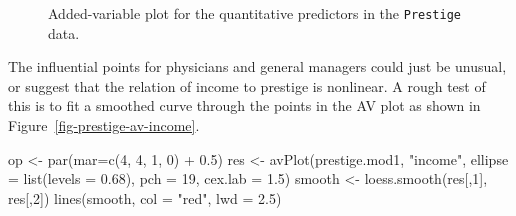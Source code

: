 \documentclass[
  letterpaper,
  10pt,
  krantz2]{krantz}
\makeatletter
\newenvironment{Shaded}{\begin{snugshade}}{\end{snugshade}}
\newcommand{\AttributeTok}[1]{\textcolor[rgb]{0.40,0.45,0.13}{#1}}
\newcommand{\DecValTok}[1]{\textcolor[rgb]{0.68,0.00,0.00}{#1}}
\newcommand{\FloatTok}[1]{\textcolor[rgb]{0.68,0.00,0.00}{#1}}
\newcommand{\FunctionTok}[1]{\textcolor[rgb]{0.28,0.35,0.67}{#1}}
\newcommand{\NormalTok}[1]{\textcolor[rgb]{0.00,0.23,0.31}{#1}}
\newcommand{\OtherTok}[1]{\textcolor[rgb]{0.00,0.23,0.31}{#1}}
\newcommand{\SpecialCharTok}[1]{\textcolor[rgb]{0.37,0.37,0.37}{#1}}
\newcommand{\StringTok}[1]{\textcolor[rgb]{0.13,0.47,0.30}{#1}}
\newenvironment{kframe}{%
  \medskip{}
  \setlength{\fboxsep}{.8em}
  \def\at@end@of@kframe{}%
  \ifinner\ifhmode%
  \def\at@end@of@kframe{\end{minipage}}%
  \begin{minipage}{\columnwidth}%
  \fi\fi%
  \def\FrameCommand##1{\hskip\@totalleftmargin \hskip-\fboxsep
  \colorbox{shadecolor}{##1}\hskip-\fboxsep
      \hskip-\linewidth \hskip-\@totalleftmargin \hskip\columnwidth}%
  \MakeFramed {\advance\hsize-\width
    \@totalleftmargin\z@ \linewidth\hsize
    \@setminipage}}%
{\par\unskip\endMakeFramed%
  \at@end@of@kframe}
\renewenvironment{Shaded}{\begin{kframe}}{\end{kframe}}
\makeatother
\begin{document}
\begin{figure}[H]


\caption{\label{fig-prestige-avplot}Added-variable plot for the
quantitative predictors in the \texttt{Prestige} data.}

\end{figure}%

The influential points for physicians and general managers could just be
unusual, or suggest that the relation of income to prestige is
nonlinear. A rough test of this is to fit a smoothed curve through the
points in the AV plot as shown in Figure~\ref{fig-prestige-av-income}.

\begin{Shaded}
\begin{Highlighting}[]
\NormalTok{op }\OtherTok{\textless{}{-}} \FunctionTok{par}\NormalTok{(}\AttributeTok{mar=}\FunctionTok{c}\NormalTok{(}\DecValTok{4}\NormalTok{, }\DecValTok{4}\NormalTok{, }\DecValTok{1}\NormalTok{, }\DecValTok{0}\NormalTok{) }\SpecialCharTok{+} \FloatTok{0.5}\NormalTok{)}
\NormalTok{res }\OtherTok{\textless{}{-}} \FunctionTok{avPlot}\NormalTok{(prestige.mod1, }\StringTok{"income"}\NormalTok{,}
              \AttributeTok{ellipse =} \FunctionTok{list}\NormalTok{(}\AttributeTok{levels =} \FloatTok{0.68}\NormalTok{),}
              \AttributeTok{pch =} \DecValTok{19}\NormalTok{,}
              \AttributeTok{cex.lab =} \FloatTok{1.5}\NormalTok{)}
\NormalTok{smooth }\OtherTok{\textless{}{-}} \FunctionTok{loess.smooth}\NormalTok{(res[,}\DecValTok{1}\NormalTok{], res[,}\DecValTok{2}\NormalTok{])}
\FunctionTok{lines}\NormalTok{(smooth, }\AttributeTok{col =} \StringTok{"red"}\NormalTok{, }\AttributeTok{lwd =} \FloatTok{2.5}\NormalTok{)}
\end{Highlighting}
\end{Shaded}
\end{document}
